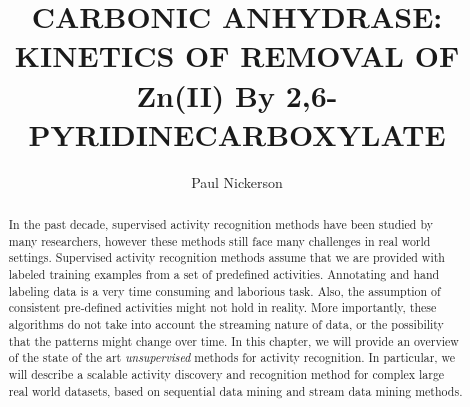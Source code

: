 \documentclass{elsarticle}
\theoremstyle{definition}
\begin{document}
\begin{frontmatter}

\title{CARBONIC ANHYDRASE: KINETICS OF REMOVAL OF Zn(II) By 2,6-PYRIDINECARBOXYLATE}

\author{Paul Nickerson}
\address{Chemistry Department, \\ University of Florida, \\ Gainesville, FL, US}

\begin{abstract}
In the past decade, supervised activity recognition methods have been studied by many researchers, however these methods still face many challenges in real world settings. Supervised activity recognition methods assume that we are provided with labeled training examples from a set of predefined activities. Annotating and hand labeling data is a very time consuming and laborious task. Also, the assumption of consistent pre-defined activities might not hold in reality. More importantly, these algorithms do not take into account the streaming nature of data, or the possibility that the patterns might change over time. In this chapter, we will provide an overview of the state of the art \emph{unsupervised} methods for activity recognition. In particular, we will describe a scalable activity discovery and recognition method for complex large real world datasets, based on sequential data mining and stream data mining methods.
\end{abstract}

\end{frontmatter}
\newpage



\end{document}
